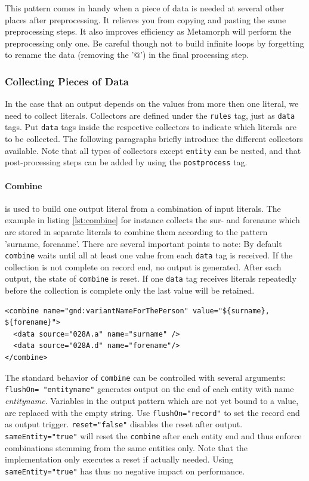 \documentclass[12pt,a4paper]{article}
\begin{document}
This pattern comes in handy when a piece of data is needed at several other places after preprocessing. It relieves you from copying and pasting the same preprocessing steps. It also improves efficiency as Metamorph will perform the preprocessing only one. Be careful though not to build infinite loops by forgetting to rename the data (removing the '@') in the final processing step.

\subsubsection{Collecting Pieces of Data}\label{collect}

In the case that an output depends on the values from more then one literal, we need to collect literals. Collectors are defined under the {\tt rules} tag, just as {\tt data} tags. Put {\tt data} tags inside the respective collectors to indicate which literals are to be collected. The following paragraphs briefly introduce the different collectors available. Note that all types of collectors except {\tt entity} can be nested, and that post-processing steps can be added by using the {\tt postprocess} tag. 


\paragraph{Combine}

is used to build one output literal from a combination of input literals. The  example in listing \ref{lst:combine} for instance collects the sur- and forename which are stored in separate literals to combine them according to the pattern 'surname, forename'.
There are several important points to note: By default {\tt combine} waits until all at least one value from each {\tt data} tag is received. If the collection is not complete on record end, no output is generated. After each output, the state of {\tt combine} is reset. If one {\tt data} tag receives literals repeatedly before the collection is complete only the last value will be retained.

\begin{lstlisting}[float=htb, label=lst:combine,caption=Combining data from two different data sources.]
<combine name="gnd:variantNameForThePerson" value="${surname}, ${forename}">
  <data source="028A.a" name="surname" />
  <data source="028A.d" name="forename"/>
</combine>
\end{lstlisting}

The standard behavior of {\tt combine} can be controlled with several arguments:
{\tt flushOn= "entityname"} generates output on the end of each entity with name {\it entityname}. Variables in the output pattern which are not yet bound to a value, are replaced with the empty string. Use {\tt flushOn="record"} to set the record end as output trigger.
{\tt reset="false"} disables the reset after output.
{\tt sameEntity="true"} will reset the {\tt combine} after each entity end and thus enforce combinations stemming from the same entities only. Note that the implementation only executes a reset if actually needed. Using {\tt sameEntity="true"} has thus no negative impact on performance.
\end{document}
